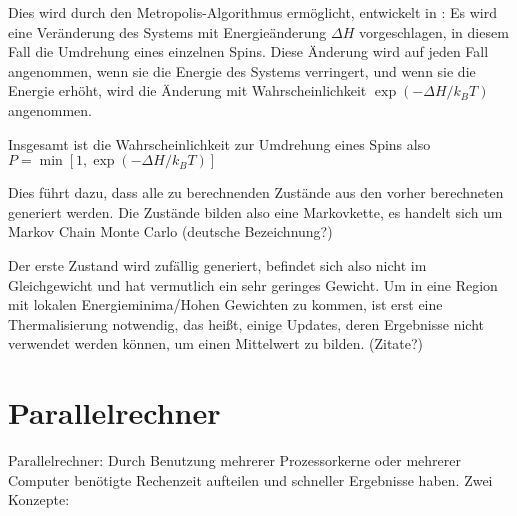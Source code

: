 \documentclass{scrreprt}
\begin{document}
	Dies wird durch den Metropolis-Algorithmus ermöglicht, entwickelt in \cite{metropolisupdate}:
	Es wird eine Veränderung des Systems mit Energieänderung $\Delta H$ vorgeschlagen, in diesem Fall die Umdrehung eines einzelnen Spins. Diese Änderung wird auf jeden Fall angenommen, wenn sie die Energie des Systems verringert, und wenn sie die Energie erhöht, wird die Änderung mit Wahrscheinlichkeit $\exp(-\Delta H/k_BT)$ angenommen.
	
	Insgesamt ist die Wahrscheinlichkeit zur Umdrehung eines Spins also $P=\min \left[1, \exp(-\Delta H/k_BT)\right]$
	
	Dies führt dazu, dass alle zu berechnenden Zustände aus den vorher berechneten generiert werden. Die Zustände bilden also eine Markovkette, es handelt sich um Markov Chain Monte Carlo (deutsche Bezeichnung?)
	
	Der erste Zustand wird zufällig generiert, befindet sich also nicht im Gleichgewicht und hat vermutlich ein sehr geringes Gewicht. Um in eine Region mit lokalen Energieminima/Hohen Gewichten zu kommen, ist erst eine Thermalisierung notwendig, das heißt, einige Updates, deren Ergebnisse nicht verwendet werden können, um einen Mittelwert zu bilden. (Zitate?)
	
		
	\section{Parallelrechner}
	Parallelrechner: Durch Benutzung mehrerer Prozessorkerne oder mehrerer Computer benötigte Rechenzeit aufteilen und schneller Ergebnisse haben. Zwei Konzepte:
\end{document}
